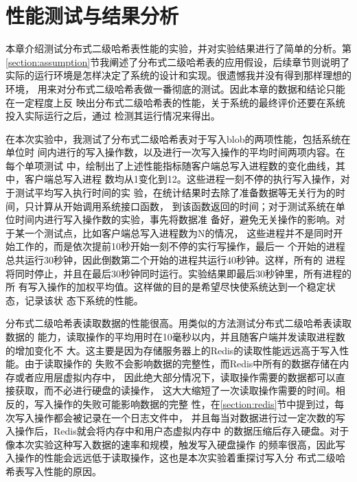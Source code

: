 \chapter{性能测试与结果分析}\label{chapter:lab}
本章介绍测试分布式二级哈希表性能的实验，并对实验结果进行了简单的分析。第
\ref{section:assumption}节我阐述了分布式二级哈希表的应用假设，后续章节则说明了
实际的运行环境是怎样决定了系统的设计和实现。很遗憾我并没有得到那样理想的环境，
用来对分布式二级哈希表做一番彻底的测试。因此本章的数据和结论只能在一定程度上反
映出分布式二级哈希表的性能，关于系统的最终评价还要在系统投入实际运行之后，通过
检测其运行情况来得出。

在本次实验中，我测试了分布式二级哈希表对于写入blob的两项性能，包括系统在单位时
间内进行的写入操作数，以及进行一次写入操作的平均时间两项内容。在每个单项测试
中，绘制出了上述性能指标随客户端总写入进程数的变化曲线，其中，客户端总写入进程
数均从1变化到12。这些进程一刻不停的执行写入操作，对于测试平均写入执行时间的实
验，在统计结果时去除了准备数据等无关行为的时间，只计算从开始调用系统接口函数，
到该函数返回的时间；对于测试系统在单位时间内进行写入操作数的实验，事先将数据准
备好，避免无关操作的影响。对于某一个测试点，比如客户端总写入进程数为N的情况，
这些进程并不是同时开始工作的，而是依次提前10秒开始一刻不停的实行写操作，最后一
个开始的进程总共运行30秒钟，因此倒数第二个开始的进程共运行40秒钟。这样，所有的
进程将同时停止，并且在最后30秒钟同时运行。实验结果即最后30秒钟里，所有进程的所
有写入操作的加权平均值。这样做的目的是希望尽快使系统达到一个稳定状态，记录该状
态下系统的性能。 

分布式二级哈希表读取数据的性能很高。用类似的方法测试分布式二级哈希表读取数据的
能力，读取操作的平均用时在10毫秒以内，并且随客户端并发读取进程数的增加变化不
大。这主要是因为存储服务器上的Redis的读取性能远远高于写入性能。由于读取操作的
失败不会影响数据的完整性，而Redis中所有的数据存储在内存或者应用层虚拟内存中，
因此绝大部分情况下，读取操作需要的数据都可以直接获取，而不必进行硬盘的读操作，
这大大缩短了一次读取操作需要的时间。相反的，写入操作的失败可能影响数据的完整
性，在\ref{section:redis}节中提到过，每次写入操作都会被记录在一个日志文件中，
并且每当对数据进行过一定次数的写入操作后，Redis就会将内存中和用户态虚拟内存中
的数据压缩后存入硬盘。对于像本次实验这种写入数据的速率和规模，触发写入硬盘操作
的频率很高，因此写入操作的性能会远远低于读取操作，这也是本次实验着重探讨写入分
布式二级哈希表写入性能的原因。

